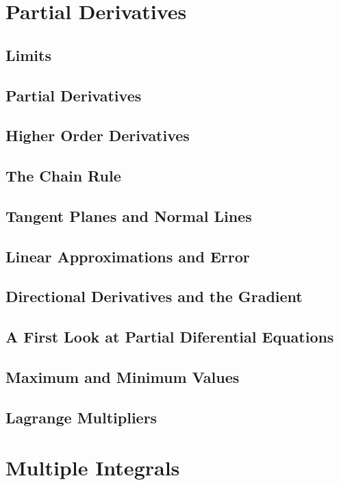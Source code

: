 \documentclass[12pt,letterpaper, openany]{book}
\begin{document}
\chapter{Partial Derivatives}
\section{Limits}

\section{Partial Derivatives}

\section{Higher Order Derivatives}

\section{The Chain Rule}

\section{Tangent Planes and Normal Lines}

\section{Linear Approximations and Error}

\section{Directional Derivatives and the Gradient}

\section{A First Look at Partial Diferential Equations}

\section{Maximum and Minimum Values}

\section{Lagrange Multipliers}


\chapter{Multiple Integrals}
\end{document}
